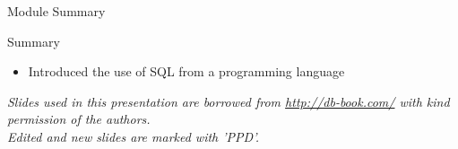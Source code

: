 \documentclass[aspectratio=169, xcolor=dvipsnames]{beamer}
\begin{document}
\begin{frame}{Module Summary}
    \begin{block}{Summary}
        \begin{itemize}[<+->]
            \item Introduced the use of SQL from a programming language
        \end{itemize}
    \end{block}
    \vspace{2em}
    \begin{center}
    \small \textit{Slides used in this presentation are borrowed from \url{http://db-book.com/} with kind permission of the authors.} \\
    \small \textit{Edited and new slides are marked with 'PPD'.}
    \end{center}
\end{frame}
\end{document}
